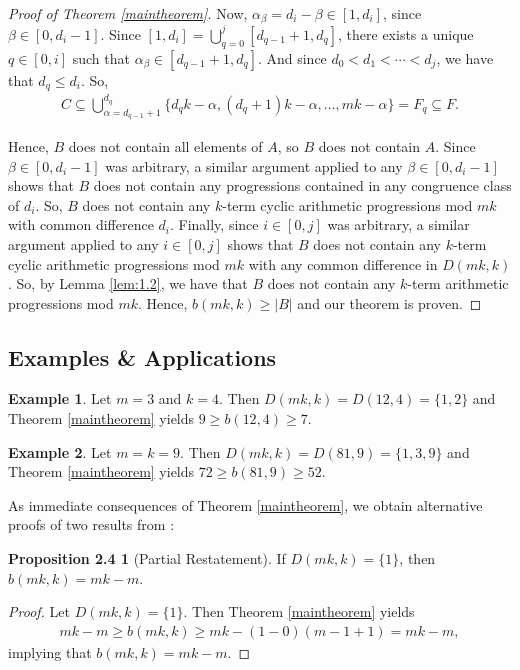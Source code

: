 \documentclass{article}
\theoremstyle{definition}
\newtheorem*{example}{Example}
\newtheorem*{proposition*}{Proposition 2.4}
\theoremstyle{remark}
\begin{document}
\begin{proof}[Proof of Theorem \ref{maintheorem}]
Now, $\alpha_\beta = d_i-\beta \in [1,d_i]$, since $\beta \in [0,d_i-1]$. Since $[1,d_i] = \bigcup_{q=0}^{j}[d_{q-1}+1,d_q]$, there exists a unique $q \in [0,i]$ such that $\alpha_\beta \in [d_{q-1}+1,d_q]$. And since $d_0 < d_1 < \cdots < d_{j}$, we have that $d_q \leq d_i$. So,
\begin{align*}
    C  \subseteq \bigcup_{\alpha=d_{q-1}+1}^{d_{q}}\{d_qk-\alpha,(d_q+1)k-\alpha,\ldots,mk-\alpha\} = F_{q} \subseteq F.
\end{align*}

Hence, $B$ does not contain all elements of $A$, so $B$ does not contain $A$. Since $\beta \in [0,d_i-1]$ was arbitrary, a similar argument applied to any $\beta \in [0,d_i-1]$ shows that $B$ does not contain any progressions contained in any congruence class of $d_i$. So, $B$ does not contain any $k$-term cyclic arithmetic progressions mod $mk$ with common difference $d_i$. Finally, since $i \in [0,j]$ was arbitrary, a similar argument applied to any $i \in [0,j]$ shows that $B$ does not contain any $k$-term cyclic arithmetic progressions mod $mk$ with any common difference in $D(mk,k)$. So, by Lemma \ref{lem:1.2}, we have that $B$ does not contain any $k$-term arithmetic progressions mod $mk$. Hence, $b(mk,k) \geq |B|$ and our theorem is proven.
\end{proof}

\subsection{Examples \& Applications}

\begin{example}
    Let $m=3$ and $k=4$. Then $D(mk,k) = D(12,4) = \{1,2\}$ and Theorem \ref{maintheorem} yields $9 \geq b(12,4) \geq 7$.
\end{example}

\begin{example}
    Let $m=k=9$. Then $D(mk,k) = D(81,9) = \{1,3,9\}$ and Theorem \ref{maintheorem} yields $72 \geq b(81,9) \geq 52$.
\end{example}

As immediate consequences of Theorem \ref{maintheorem}, we obtain alternative proofs of two results from \cite{Berglund}:

\begin{proposition*}[Partial Restatement]
    If $D(mk,k) = \{1\}$, then $b(mk,k) = mk-m$.
\end{proposition*}

\begin{proof}
    Let $D(mk,k) = \{1\}$. Then Theorem \ref{maintheorem} yields \begin{align*}
        mk-m \geq b(mk,k) \geq mk-(1-0)(m-1+1) = mk-m,
    \end{align*} implying that $b(mk,k) = mk-m$.
\end{proof}
\end{document}
